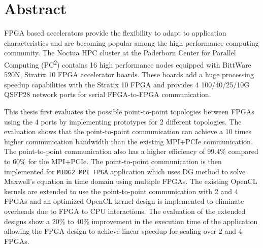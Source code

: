 \chapter{Abstract}

FPGA based accelerators provide the flexibility to adapt to application
characteristics and are becoming popular among the high performance computing
community. The Noctua HPC cluster at the Paderborn Center for Parallel
Computing (PC\textsuperscript{2}) contains 16 high performance nodes
equipped with BittWare 520N, Stratix 10 FPGA accelerator boards.
These boards add a huge processing speedup capabilities with the Stratix 10
FPGA and provides 4 100/40/25/10G QSFP28 network ports for serial FPGA-to-FPGA
communication.

This thesis first evaluates the possible point-to-point topologies between
FPGAs using the 4 ports by implementing prototypes for 2 different topologies.
The evaluation shows that the point-to-point communication can achieve a 10
times higher communication bandwidth than the existing MPI+PCIe communication.
The point-to-point communication also has a higher efficiency of 99.4\% compared
to 60\% for the MPI+PCIe. The point-to-point communication is then implemented
for \texttt{MIDG2 MPI FPGA} application which uses \acl{DG} method to solve Maxwell’s equation
in time domain using multiple FPGAs. The existing OpenCL kernels are extended to
use the point-to-point communication with 2 and 4 FPGAs and an optimized OpenCL
kernel design is implemented to eliminate overheads due to FPGA to CPU interactions.
The evaluation of the extended designs show a 20\% to 40\% improvement in the
execution time of the application allowing the FPGA design to achieve linear speedup for
scaling over 2 and 4 FPGAs.